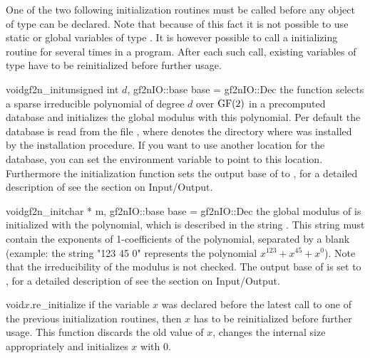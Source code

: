 
\INIT

One of the two following initialization routines must be called before any object of type
 can be declared.  Note that because of this fact it is not possible to use static or
global variables of type .  It is however possible to call a initializing routine for
 several times in a program.  After each such call, existing variables of type
 have to be reinitialized before further usage.

\begin{fcode}{void}{gf2n_init}{unsigned int $d$, gf2nIO::base base = gf2nIO::Dec}
  the function selects a sparse irreducible polynomial of degree $d$ over $\mathrm{GF}(2)$ in a
  precomputed database and initializes the global modulus with this polynomial.  Per default the
  database is read from the file , where
   denotes the directory where \LiDIA was installed by the installation
  procedure.  If you want to use another location for the database, you can set the environment
  variable  to point to this location.  Furthermore the initialization function
  sets the output base of  to , for a detailed description of
   see the section on Input/Output.
\end{fcode}

\begin{fcode}{void}{gf2n_init}{char * m, gf2nIO::base base = gf2nIO::Dec}
  the global modulus of  is initialized with the polynomial, which is described in
  the string .  This string must contain the exponents of 1-coefficients of the
  polynomial, separated by a blank (example: the string "123 45 0" represents the polynomial
  $x^{123}+x^{45}+x^{0}$).  Note that the irreducibility of the modulus is not checked.  The
  output base of  is set to , for a detailed description of
   see the section on Input/Output.
\end{fcode}

\begin{fcode}{void}{$x$.re_initialize}{}
  if the variable $x$ was declared before the latest call to one of the previous initialization
  routines, then $x$ has to be reinitialized before further usage.  This function discards the
  old value of $x$, changes the internal size appropriately and initializes $x$ with $0$.
\end{fcode}

